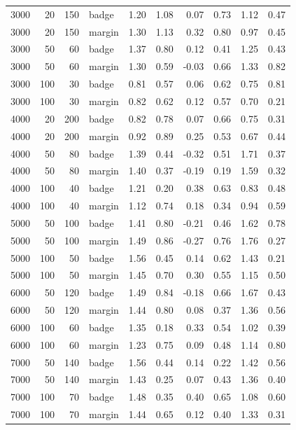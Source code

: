 \begin{tabular}{rrrlrrrrrr}
3000 & 20 & 150 & badge & 1.20 & 1.08 & 0.07 & 0.73 & 1.12 & 0.47 \\
3000 & 20 & 150 & margin & 1.30 & 1.13 & 0.32 & 0.80 & 0.97 & 0.45 \\
3000 & 50 & 60 & badge & 1.37 & 0.80 & 0.12 & 0.41 & 1.25 & 0.43 \\
3000 & 50 & 60 & margin & 1.30 & 0.59 & -0.03 & 0.66 & 1.33 & 0.82 \\
3000 & 100 & 30 & badge & 0.81 & 0.57 & 0.06 & 0.62 & 0.75 & 0.81 \\
3000 & 100 & 30 & margin & 0.82 & 0.62 & 0.12 & 0.57 & 0.70 & 0.21 \\
4000 & 20 & 200 & badge & 0.82 & 0.78 & 0.07 & 0.66 & 0.75 & 0.31 \\
4000 & 20 & 200 & margin & 0.92 & 0.89 & 0.25 & 0.53 & 0.67 & 0.44 \\
4000 & 50 & 80 & badge & 1.39 & 0.44 & -0.32 & 0.51 & 1.71 & 0.37 \\
4000 & 50 & 80 & margin & 1.40 & 0.37 & -0.19 & 0.19 & 1.59 & 0.32 \\
4000 & 100 & 40 & badge & 1.21 & 0.20 & 0.38 & 0.63 & 0.83 & 0.48 \\
4000 & 100 & 40 & margin & 1.12 & 0.74 & 0.18 & 0.34 & 0.94 & 0.59 \\
5000 & 50 & 100 & badge & 1.41 & 0.80 & -0.21 & 0.46 & 1.62 & 0.78 \\
5000 & 50 & 100 & margin & 1.49 & 0.86 & -0.27 & 0.76 & 1.76 & 0.27 \\
5000 & 100 & 50 & badge & 1.56 & 0.45 & 0.14 & 0.62 & 1.43 & 0.21 \\
5000 & 100 & 50 & margin & 1.45 & 0.70 & 0.30 & 0.55 & 1.15 & 0.50 \\
6000 & 50 & 120 & badge & 1.49 & 0.84 & -0.18 & 0.66 & 1.67 & 0.43 \\
6000 & 50 & 120 & margin & 1.44 & 0.80 & 0.08 & 0.37 & 1.36 & 0.56 \\
6000 & 100 & 60 & badge & 1.35 & 0.18 & 0.33 & 0.54 & 1.02 & 0.39 \\
6000 & 100 & 60 & margin & 1.23 & 0.75 & 0.09 & 0.48 & 1.14 & 0.80 \\
7000 & 50 & 140 & badge & 1.56 & 0.44 & 0.14 & 0.22 & 1.42 & 0.56 \\
7000 & 50 & 140 & margin & 1.43 & 0.25 & 0.07 & 0.43 & 1.36 & 0.40 \\
7000 & 100 & 70 & badge & 1.48 & 0.35 & 0.40 & 0.65 & 1.08 & 0.60 \\
7000 & 100 & 70 & margin & 1.44 & 0.65 & 0.12 & 0.40 & 1.33 & 0.31 \\

\end{tabular}
